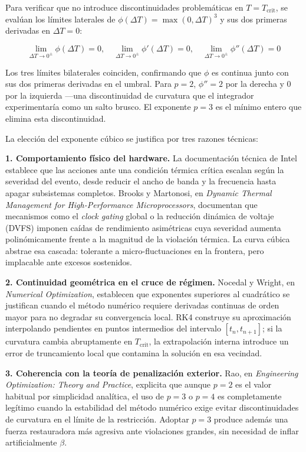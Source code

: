 \documentclass[10pt, twocolumn]{article}
\begin{document}
Para verificar que no introduce discontinuidades problemáticas en $T = T_{\text{crit}}$,
se evalúan los límites laterales de
$\phi(\Delta T) = \max(0, \Delta T)^3$ y sus dos primeras derivadas en $\Delta T = 0$:

\begin{equation*}
  \lim_{\Delta T \to 0^{\pm}} \phi(\Delta T) = 0, \quad
  \lim_{\Delta T \to 0^{\pm}} \phi'(\Delta T) = 0, \quad
  \lim_{\Delta T \to 0^{\pm}} \phi''(\Delta T) = 0
\end{equation*}

Los tres límites bilaterales coinciden, confirmando que $\phi$ es continua junto
con sus dos primeras derivadas en el umbral. Para $p = 2$, $\phi'' = 2$ por la
derecha y $0$ por la izquierda ---una discontinuidad de curvatura que el integrador
experimentaría como un salto brusco. El exponente $p = 3$ es el mínimo entero que
elimina esta discontinuidad.

La elección del exponente cúbico se justifica por tres razones técnicas:

\smallskip\noindent\textbf{1. Comportamiento físico del hardware.}
La documentación técnica de Intel establece que las acciones ante una condición
térmica crítica escalan según la severidad del evento, desde reducir el ancho de
banda y la frecuencia hasta apagar subsistemas completos. Brooks y Martonosi, en
\emph{Dynamic Thermal Management for High-Performance Microprocessors}, documentan
que mecanismos como el \emph{clock gating} global o la reducción dinámica de
voltaje (DVFS) imponen caídas de rendimiento asimétricas cuya severidad aumenta
polinómicamente frente a la magnitud de la violación térmica. La curva cúbica
abstrae esa cascada: tolerante a micro-fluctuaciones en la frontera, pero
implacable ante excesos sostenidos.

\smallskip\noindent\textbf{2. Continuidad geométrica en el cruce de régimen.}
Nocedal y Wright, en \emph{Numerical Optimization}, establecen que exponentes
superiores al cuadrático se justifican cuando el método numérico requiere derivadas
continuas de orden mayor para no degradar su convergencia local. RK4 construye su
aproximación interpolando pendientes en puntos intermedios del intervalo
$[t_n, t_{n+1}]$; si la curvatura cambia abruptamente en $T_{\text{crit}}$, la
extrapolación interna introduce un error de truncamiento local que contamina la
solución en esa vecindad.

\smallskip\noindent\textbf{3. Coherencia con la teoría de penalización exterior.}
Rao, en \emph{Engineering Optimization: Theory and Practice}, explicita que aunque
$p = 2$ es el valor habitual por simplicidad analítica, el uso de $p = 3$ o
$p = 4$ es completamente legítimo cuando la estabilidad del método numérico exige
evitar discontinuidades de curvatura en el límite de la restricción. Adoptar
$p = 3$ produce además una fuerza restauradora más agresiva ante violaciones
grandes, sin necesidad de inflar artificialmente $\beta$.
\end{document}
